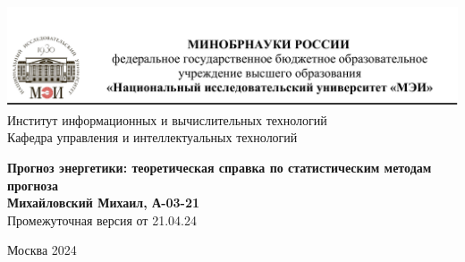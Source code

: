 \begin{titlepage}
	\newpage
	\begin{center}
		\includegraphics[width=\textwidth]{tit.png}
		Институт информационных и вычислительных технологий \\
			Кафедра управления и интеллектуальных технологий
		\vspace{1.25cm}
	\end{center}
	
	\vspace{1.2em}
	
	\begin{center}
		\begin{spacing}{1}
			{\Large \textbf{ Прогноз энергетики: теоретическая справка по статистическим методам прогноза} \\}
			\vspace{1em}
			{ \large \textbf{Михайловский Михаил, А-03-21}\\}
			\vspace{0.3em}
			{Промежуточная версия от 21.04.24}
			
		\end{spacing}
	\end{center}
	
	\vspace{6em}
	

	\vspace{6em}
	
	
	\vspace{\fill}
	
	\begin{center}
		Москва 2024
	\end{center}
	
\end{titlepage}